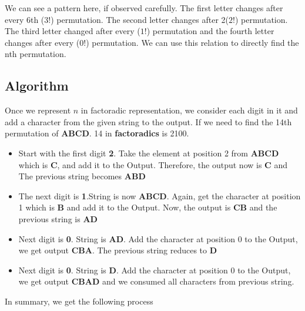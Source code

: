 \par
We can see a pattern here, if observed carefully. The first letter changes after every 6th ($3!$) permutation. The second letter changes after 2($2!$) permutation. The third letter changed after every ($1!$) permutation and the fourth letter changes after every ($0!$) permutation. We can use this relation to directly find the nth permutation.
\subsection{Algorithm}
Once we represent $n$ in factoradic representation, we consider each digit in it and add a character from the given string to the output. If we need to find the 14th permutation of \textbf{ABCD}. 14 in \textbf{factoradics} is 2100.
\begin{itemize}
    \item Start with the first digit \textbf{2}. Take the element at position 2 from \textbf{ABCD} which is \textbf{C}, and add it to the Output. Therefore, the output now is \textbf{C} and The previous string becomes \textbf{ABD}
    \item The next digit is \textbf{1}.String is now \textbf{ABCD}. Again, get the character at position 1 which is \textbf{B} and add it to the Output. Now, the output is \textbf{CB} and the previous string is \textbf{AD}
    \item Next digit is \textbf{0}. String is \textbf{AD}. Add the character at position 0 to the Output, we get output \textbf{CBA}. The previous string reduces to \textbf{D}
    \item Next digit is \textbf{0}. String is \textbf{D}. Add the character at position 0 to the Output, we get output \textbf{CBAD} and we consumed all characters from previous string.
\end{itemize}
In summary, we get the following process
